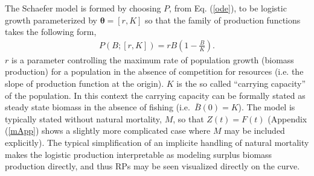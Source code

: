 %
The Schaefer model is formed by choosing $P$, from Eq. (\ref{ode}), to be logistic 
growth \cite{mangel_theoretical_2006} parameterized by $\bm{\theta} = [r, K]$ 
so that the family of production functions takes the following form,
%
\begin{align}
P(B; [r, K]) = r B \left(1-\frac{B}{K}\right). \label{logistic}
\end{align}
$r$ is a parameter controlling the maximum rate of population growth (biomass production) %
for a population in the absence of competition for resources (i.e. the slope 
of production function at the origin). $K$ is the so called ``carrying 
capacity'' of the population. In this context the carrying capacity can be 
formally stated as steady state biomass in the absence of fishing \mbox{(i.e. 
$\bar B(0)=K$).} The model is typically stated without natural mortality, $M$, 
so that $Z(t)=F(t)$ (Appendix (\ref{mApp}) shows a slightly more complicated 
case where $M$ may be included explicitly). %
The typical simplification of an implicite handling of natural mortality 
makes the logistic production interpretable as modeling surplus 
biomass production directly, and thus RPs may be seen visualized directly on the curve.  

